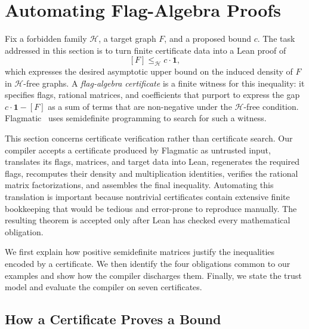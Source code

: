 \documentclass{article}
\begin{document}
\section{Automating Flag-Algebra Proofs}
\label{sec:flagmatic}

Fix a forbidden family \(\mathcal H\), a target graph \(F\), and a proposed
bound \(c\).  The task addressed in this section is to turn finite certificate
data into a Lean proof of
\[
  [F]\leq_{\mathcal H}c\cdot\mathbf{1},
\]
which expresses the desired asymptotic upper bound on the induced density of
\(F\) in \(\mathcal H\)-free graphs.  A \emph{flag-algebra certificate} is a
finite witness for this inequality: it specifies flags, rational matrices, and
coefficients that purport to express the gap
\(c\cdot\mathbf{1}-[F]\) as a sum of terms that are non-negative under the
\(\mathcal H\)-free condition.  Flagmatic~\cite{vaughan2013flagmatic} uses
semidefinite programming to search for such a witness.

This section concerns certificate verification rather than certificate
search.  Our compiler accepts a certificate produced by Flagmatic as untrusted
input, translates its flags, matrices, and target data into Lean, regenerates
the required flags, recomputes their density and multiplication identities,
verifies the rational matrix factorizations, and assembles the final
inequality.  Automating this translation is important because nontrivial
certificates contain extensive finite bookkeeping that would be tedious and
error-prone to reproduce manually.  The resulting theorem is accepted only
after Lean has checked every mathematical obligation.

We first explain how positive semidefinite matrices justify the inequalities
encoded by a certificate.  We then identify the four obligations common to our
examples and show how the compiler discharges them.  Finally, we state the
trust model and evaluate the compiler on seven certificates.

\subsection{How a Certificate Proves a Bound}
\label{sec:flagmatic-background}
\end{document}
